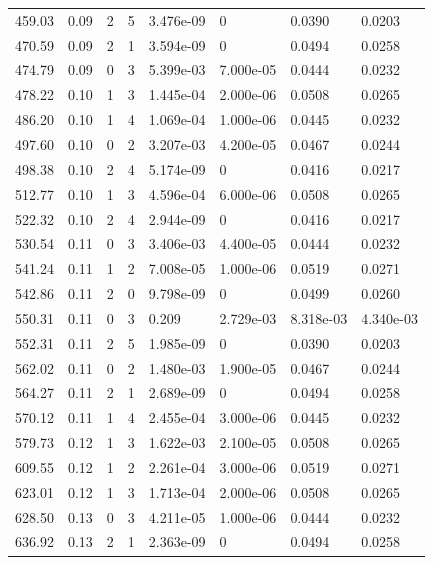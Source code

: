 \documentclass[preview]{standalone}
\begin{document}
{{{\begin{tabular}{L{1.2cm}C{1.2cm} C{0.3cm}C{0.5cm} C{1.4cm}C{1.4cm} C{1.4cm}C{1.4cm}}
  459.03  &  0.09  & 2     &  5 &  3.476e-09  & 0  & 0.0390 &  0.0203   \\ 
  470.59  &  0.09  & 2     &  1 &  3.594e-09  & 0  & 0.0494 &  0.0258   \\ 
  474.79  &  0.09  & 0     &  3 &  5.399e-03  & 7.000e-05  & 0.0444 &  0.0232   \\ 
  478.22  &  0.10  & 1     &  3 &  1.445e-04  & 2.000e-06  & 0.0508 &  0.0265   \\ 
  486.20  &  0.10  & 1     &  4 &  1.069e-04  & 1.000e-06  & 0.0445 &  0.0232   \\ 
  497.60  &  0.10  & 0     &  2 &  3.207e-03  & 4.200e-05  & 0.0467 &  0.0244   \\ 
  498.38  &  0.10  & 2     &  4 &  5.174e-09  & 0  & 0.0416 &  0.0217   \\ 
  512.77  &  0.10  & 1     &  3 &  4.596e-04  & 6.000e-06  & 0.0508 &  0.0265   \\ 
  522.32  &  0.10  & 2     &  4 &  2.944e-09  & 0  & 0.0416 &  0.0217   \\ 
  530.54  &  0.11  & 0     &  3 &  3.406e-03  & 4.400e-05  & 0.0444 &  0.0232   \\ 
  541.24  &  0.11  & 1     &  2 &  7.008e-05  & 1.000e-06  & 0.0519 &  0.0271   \\ 
  542.86  &  0.11  & 2     &  0 &  9.798e-09  & 0  & 0.0499 &  0.0260   \\ 
  550.31  &  0.11  & 0     &  3 &  0.209  & 2.729e-03  & 8.318e-03 &  4.340e-03   \\ 
  552.31  &  0.11  & 2     &  5 &  1.985e-09  & 0  & 0.0390 &  0.0203   \\ 
  562.02  &  0.11  & 0     &  2 &  1.480e-03  & 1.900e-05  & 0.0467 &  0.0244   \\ 
  564.27  &  0.11  & 2     &  1 &  2.689e-09  & 0  & 0.0494 &  0.0258   \\ 
  570.12  &  0.11  & 1     &  4 &  2.455e-04  & 3.000e-06  & 0.0445 &  0.0232   \\ 
  579.73  &  0.12  & 1     &  3 &  1.622e-03  & 2.100e-05  & 0.0508 &  0.0265   \\ 
  609.55  &  0.12  & 1     &  2 &  2.261e-04  & 3.000e-06  & 0.0519 &  0.0271   \\ 
  623.01  &  0.12  & 1     &  3 &  1.713e-04  & 2.000e-06  & 0.0508 &  0.0265   \\ 
  628.50  &  0.13  & 0     &  3 &  4.211e-05  & 1.000e-06  & 0.0444 &  0.0232   \\ 
  636.92  &  0.13  & 2     &  1 &  2.363e-09  & 0  & 0.0494 &  0.0258   \\ 

\end{tabular}}}}
\end{document}
